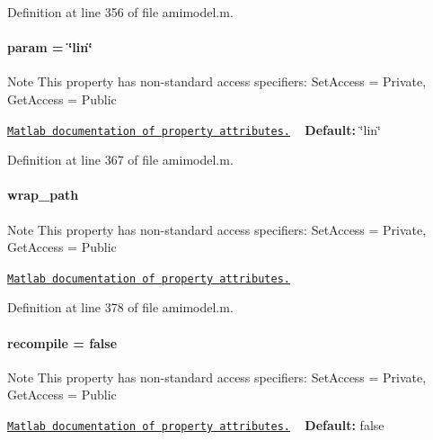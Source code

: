 Definition at line 356 of file amimodel.\+m.

\hypertarget{classamimodel_a51f20d6b1b54a2eee3be0e8adc96a0ae}{}
\paragraph[{param}]{\setlength{\rightskip}{0pt plus 5cm}param = \char`\"{}lin\char`\"{}}\label{classamimodel_a51f20d6b1b54a2eee3be0e8adc96a0ae}
\begin{DoxyNote}{Note}
This property has non-\/standard access specifiers\+: {\ttfamily Set\+Access = Private, Get\+Access = Public} 

\href{http://www.mathworks.com/help/matlab/matlab_oop/property-attributes.html}{\tt Matlab documentation of property attributes.} ~\newline
{\bfseries Default\+:} \char`\"{}lin\char`\"{} 
\end{DoxyNote}


Definition at line 367 of file amimodel.\+m.

\hypertarget{classamimodel_a0b316a20054ba282555674d939a82406}{}
\paragraph[{wrap\+\_\+path}]{\setlength{\rightskip}{0pt plus 5cm}wrap\+\_\+path}\label{classamimodel_a0b316a20054ba282555674d939a82406}
\begin{DoxyNote}{Note}
This property has non-\/standard access specifiers\+: {\ttfamily Set\+Access = Private, Get\+Access = Public} 

\href{http://www.mathworks.com/help/matlab/matlab_oop/property-attributes.html}{\tt Matlab documentation of property attributes.} 
\end{DoxyNote}


Definition at line 378 of file amimodel.\+m.

\hypertarget{classamimodel_a8d2e824e03e32034b634a7c48f2a26c6}{}
\paragraph[{recompile}]{\setlength{\rightskip}{0pt plus 5cm}recompile = false}\label{classamimodel_a8d2e824e03e32034b634a7c48f2a26c6}
\begin{DoxyNote}{Note}
This property has non-\/standard access specifiers\+: {\ttfamily Set\+Access = Private, Get\+Access = Public} 

\href{http://www.mathworks.com/help/matlab/matlab_oop/property-attributes.html}{\tt Matlab documentation of property attributes.} ~\newline
{\bfseries Default\+:} false 
\end{DoxyNote}



